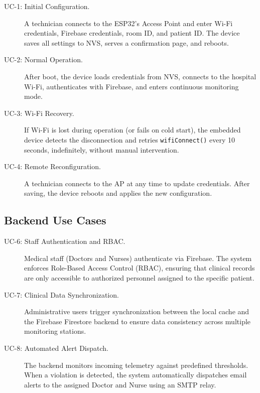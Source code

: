 \begin{description}
	\item[UC-1: Initial Configuration.]
	      A technician connects to the ESP32's Access Point and enter Wi-Fi credentials, Firebase credentials, room ID, and patient ID. The device saves all settings to NVS, serves a confirmation page, and reboots.

	\item[UC-2: Normal Operation.]
	      After boot, the device loads credentials from NVS, connects to the hospital Wi-Fi,
	      authenticates with Firebase, and enters continuous monitoring mode.

	\item[UC-3: Wi-Fi Recovery.]
	      If Wi-Fi is lost during operation (or fails on cold start), the embedded device
	      detects the disconnection and retries \texttt{wifiConnect()} every 10 seconds,
	      indefinitely, without manual intervention.

	\item[UC-4: Remote Reconfiguration.]
	      A technician connects to the AP at any time to update credentials.
	      After saving, the device reboots and applies the new configuration.
\end{description}

\subsection*{Backend Use Cases}

\begin{description}
	\item[UC-6: Staff Authentication and RBAC.]
	      Medical staff (Doctors and Nurses) authenticate via Firebase. The system enforces Role-Based Access Control (RBAC), ensuring that clinical records are only accessible to authorized personnel assigned to the specific patient.
	      
	\item[UC-7: Clinical Data Synchronization.]
	      Administrative users trigger synchronization between the local cache and the Firebase Firestore backend to ensure data consistency across multiple monitoring stations.
	      
	\item[UC-8: Automated Alert Dispatch.]
	      The backend monitors incoming telemetry against predefined thresholds. When a violation is detected, the system automatically dispatches email alerts to the assigned Doctor and Nurse using an SMTP relay.
\end{description}


